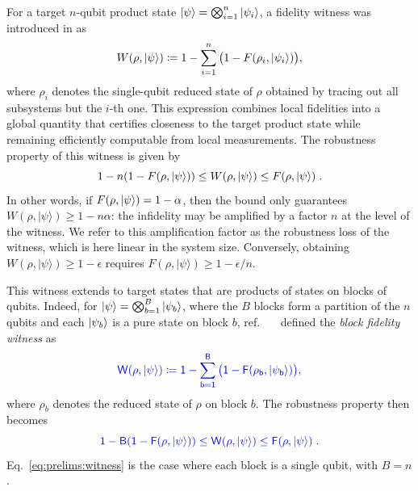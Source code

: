 \documentclass[a4paper,twocolumn,11pt,unpublished]{../../revision/quantumarticle}
\providecommand{\DIFadd}[1]{{\protect\color{blue} \sf #1}} %
\providecommand{\DIFaddbegin}{} %
\begin{document}
For a target $n$-qubit product state $\ket{\psi}=\bigotimes_{i=1}^n\ket{\psi_i}$, a fidelity witness was introduced in \cite{CGKM21efficient} as
\begin{equation}
    \label{eq:prelims:witness}
    W(\rho, \ket{\psi}) 
    \coloneqq 1 - 
    \sum_{i=1}^{n}
    \big(1 - F(\rho_i, \ket{\psi_i})\big),
\end{equation}
where $\rho_i$ denotes the single-qubit reduced state of $\rho$ obtained by tracing out all subsystems but the $i$-th one.
This expression combines local fidelities into a global quantity that certifies closeness to the target product state while remaining efficiently computable from local measurements. The {robustness} property of this witness is given by \cite{CGKM21efficient}
\begin{equation}
    \label{eq:prelims:witness:robustness}
    1-n(1-F(\rho, \ket\psi)) \leq W(\rho, \ket\psi)\leq F(\rho, \ket\psi)\; .
\end{equation}
In other words, if $F(\rho,\ket\psi)=1-\alpha$, then the bound only guarantees $W(\rho,|\psi\rangle)\geq 1-n\alpha$: the infidelity may be amplified by a factor $n$ at the level of the witness. We refer to this amplification factor as the robustness loss of the witness, which is here linear in the system size. Conversely, obtaining $W(\rho,|\psi\rangle)\geq 1-\epsilon$ requires $F(\rho,|\psi\rangle)\geq 1-\epsilon/n$.

\DIFaddbegin \DIFadd{This witness extends to target states that are products of states on blocks of qubits. Indeed,
for $\ket{\psi}=\bigotimes_{b=1}^{B}\ket{\psi_b}$, where the $B$ blocks form a partition of the $n$ qubits and each $\ket{\psi_b}$ is a pure state on block $b$, ref.~\mbox{%
\cite{UC24efficient} }\hskip0pt%
defined the }\emph{\DIFadd{block fidelity witness}} \DIFadd{as
}\begin{equation}
    \DIFadd{\label{eq:prelims:blockwitness}
    W(\rho, \ket{\psi})
    \coloneqq 1 -
    \sum_{b=1}^{B}
    \big(1 - F(\rho_b, \ket{\psi_b})\big),
}\end{equation}
\DIFadd{where $\rho_b$ denotes the reduced state of $\rho$ on block $b$. The robustness property then becomes
}\begin{equation}
    \DIFadd{\label{eq:prelims:blockwitness:robustness}
    1-B(1-F(\rho, \ket\psi)) \leq W(\rho, \ket\psi)\leq F(\rho, \ket\psi)\; .
}\end{equation}
\DIFadd{Eq.~\eqref{eq:prelims:witness} is the case where each block is a single qubit, with $B=n$.
}
\end{document}
